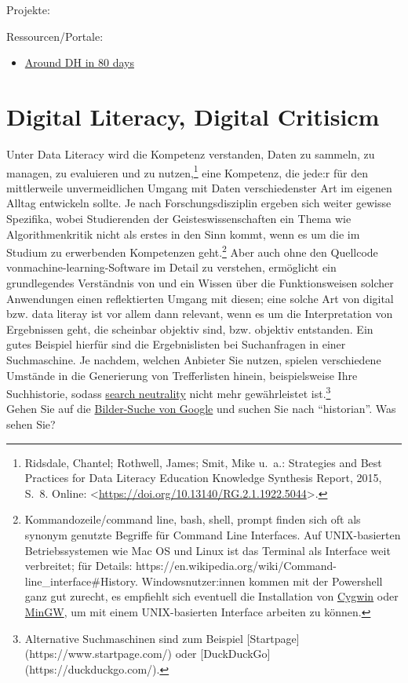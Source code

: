\documentclass[
  letterpaper,
]{book}
\providecommand{\tightlist}{%
  \setlength{\itemsep}{0pt}\setlength{\parskip}{0pt}}\usepackage{longtable,booktabs,array}
\begin{document}
Projekte:

Ressourcen/Portale:

\begin{itemize}
\tightlist
\item
  \href{https://arounddh.org/index.html}{Around DH in 80 days}
\end{itemize}


\hypertarget{digital-literacy-digital-critisicm}{%
\chapter{Digital Literacy, Digital
Critisicm}\label{digital-literacy-digital-critisicm}}

Unter Data Literacy wird die Kompetenz verstanden, Daten zu sammeln, zu
managen, zu evaluieren und zu nutzen,\footnote{Ridsdale, Chantel;
  Rothwell, James; Smit, Mike u.~a.: Strategies and {Best} {Practices}
  for {Data} {Literacy} {Education} {Knowledge} {Synthesis} {Report},
  2015, S.~8. Online:
  \textless{}\url{https://doi.org/10.13140/RG.2.1.1922.5044}\textgreater.}
eine Kompetenz, die jede:r für den mittlerweile unvermeidlichen Umgang
mit Daten verschiedenster Art im eigenen Alltag entwickeln sollte. Je
nach Forschungsdisziplin ergeben sich weiter gewisse Spezifika, wobei
Studierenden der Geisteswissenschaften ein Thema wie Algorithmenkritik
nicht als erstes in den Sinn kommt, wenn es um die im Studium zu
erwerbenden Kompetenzen geht.\footnote{Kommandozeile/command line, bash,
  shell, prompt finden sich oft als synonym genutzte Begriffe für
  Command Line Interfaces. Auf UNIX-basierten Betriebssystemen wie Mac
  OS und Linux ist das Terminal als Interface weit verbreitet; für
  Details:
  https://en.wikipedia.org/wiki/Command-line\_interface\#History.
  Windowsnutzer:innen kommen mit der Powershell ganz gut zurecht, es
  empfiehlt sich eventuell die Installation von
  \href{https://en.wikipedia.org/wiki/Cygwin}{Cygwin} oder
  \href{https://en.wikipedia.org/wiki/MinGW}{MinGW}, um mit einem
  UNIX-basierten Interface arbeiten zu können.} Aber auch ohne den
Quellcode vonmachine-learning-Software im Detail zu verstehen,
ermöglicht ein grundlegendes Verständnis von und ein Wissen über die
Funktionsweisen solcher Anwendungen einen reflektierten Umgang mit
diesen; eine solche Art von digital bzw. data literay ist vor allem dann
relevant, wenn es um die Interpretation von Ergebnissen geht, die
scheinbar objektiv sind, bzw. objektiv entstanden. Ein gutes Beispiel
hierfür sind die Ergebnislisten bei Suchanfragen in einer Suchmaschine.
Je nachdem, welchen Anbieter Sie nutzen, spielen verschiedene Umstände
in die Generierung von Trefferlisten hinein, beispielsweise Ihre
Suchhistorie, sodass
\href{https://en.wikipedia.org/wiki/Search_neutrality}{search
neutrality} nicht mehr gewährleistet ist.\footnote{Alternative
  Suchmaschinen sind zum Beispiel
  {[}Startpage{]}(https://www.startpage.com/) oder
  {[}DuckDuckGo{]}(https://duckduckgo.com/).}\\
Gehen Sie auf die \href{https://images.google.com/}{Bilder-Suche von
Google} und suchen Sie nach ``historian''. Was sehen Sie?
\end{document}
